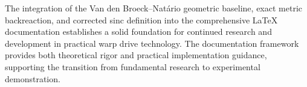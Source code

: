 \documentclass[11pt]{article}
\begin{document}
The integration of the Van den Broeck–Natário geometric baseline, exact metric backreaction, and corrected sinc definition into the comprehensive LaTeX documentation establishes a solid foundation for continued research and development in practical warp drive technology. The documentation framework provides both theoretical rigor and practical implementation guidance, supporting the transition from fundamental research to experimental demonstration.
\end{document}
